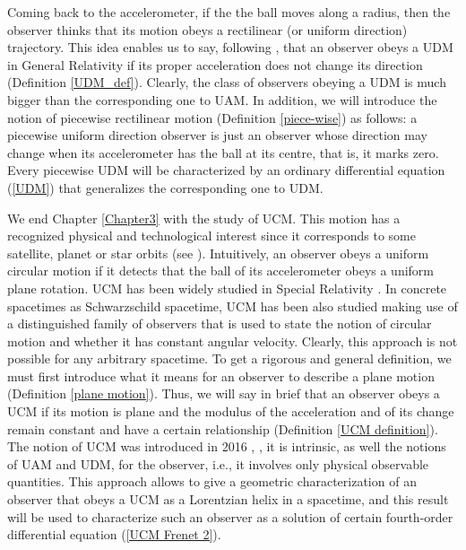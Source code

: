 \documentclass[11pt]{book}
\begin{document}
Coming back to the accelerometer, if the the ball moves along a radius, then the observer thinks that its motion obeys a rectilinear (or uniform direction) trajectory. This idea enables us to say, following \cite{UDM}, that an observer obeys a UDM in General Relativity if its proper acceleration does not change its direction (Definition \ref{UDM_def}). Clearly, the class of observers obeying a UDM is much bigger than the corresponding one to UAM. In addition, we will introduce the notion of piecewise rectilinear motion (Definition \ref{piece-wise}) as follows: a piecewise uniform direction observer is just an observer whose direction may change when its accelerometer has the ball at its centre, that is, it marks zero. Every piecewise UDM will be characterized by an ordinary differential equation (\ref{UDM}) that generalizes the corresponding one to UDM.


We end Chapter \ref{Chapter3} with the study of UCM. This motion has a recognized physical and technological interest since it corresponds to some satellite, planet or star orbits (see \cite{Geisler}). Intuitively, an observer obeys a uniform circular motion if it detects that the ball of its accelerometer obeys a uniform plane rotation. UCM has been widely studied in Special Relativity \cite{thomas precession}. In concrete spacetimes as  Schwarzschild spacetime, UCM has been also studied making use of a distinguished family of observers that is used to state the notion of circular motion and whether it has constant angular velocity. Clearly, this approach is not possible for any arbitrary spacetime. To get a rigorous and general definition, we must first introduce what it means for an observer to describe a plane motion (Definition \ref{plane motion}). Thus, we will say in brief that an observer obeys a UCM if its motion is plane and the modulus of the acceleration and of its change remain constant and have a certain relationship (Definition \ref{UCM definition}). The notion of UCM was introduced in 2016 \cite{UCM}, \cite{KGR}, it is intrinsic, as well the notions of UAM and UDM, for the observer, i.e., it involves only physical observable quantities. This approach allows to give a geometric characterization of an observer that obeys a UCM as a Lorentzian helix in a spacetime, and this result will be used to characterize such an observer as a solution of certain fourth-order differential equation (\ref{UCM Frenet 2}).
\end{document}
